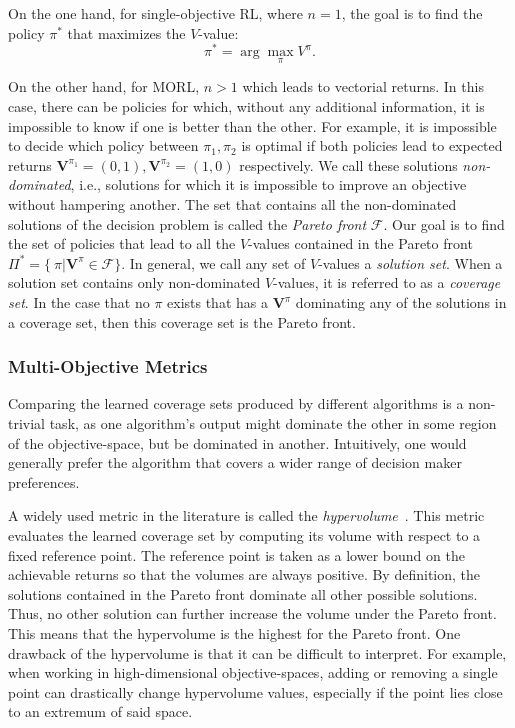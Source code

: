 \documentclass{article}
\renewcommand{\cite}[1]{\citep{#1}}
\newcommand{\mdppolicy}{\pi}
\newcommand{\mdpvaluefunction}{V}
\newcommand{\momdpvaluefunction}{\mathbf{V}}
\begin{document}
On the one hand, for single-objective RL, where $n = 1$, the goal is to find the policy $\mdppolicy^{*}$ that maximizes the $\mdpvaluefunction$-value:
\begin{equation}
\mdppolicy^*= \arg\max_\mdppolicy \mdpvaluefunction^\mdppolicy.
\end{equation}

On the other hand, for MORL, $n > 1$ which leads to vectorial returns. In this case, there can be policies for which, without any additional information, it is impossible to know if one is better than the other. For example, it is impossible to decide which policy between $\mdppolicy_1, \mdppolicy_2$ is optimal if both policies lead to expected returns $\momdpvaluefunction^{\mdppolicy_1}=(0,1), \momdpvaluefunction^{\mdppolicy_2}=(1,0)$ respectively. We call these solutions \emph{non-dominated}, i.e., solutions for which it is impossible to improve an objective without hampering another. The set that contains all the non-dominated solutions of the decision problem is called the \emph{Pareto front} $\mathcal{F}$. Our goal is to find the set of policies that lead to all the $\mdpvaluefunction$-values contained in the Pareto front $\Pi^* = \{\ \pi | \momdpvaluefunction^{\pi} \in \mathcal{F}\}$. In general, we call any set of $\mdpvaluefunction$-values a \emph{solution set}. When a solution set contains only  non-dominated $\mdpvaluefunction$-values, it is referred to as a \emph{coverage set}. In the case that no $\mdppolicy$ exists that has a $\momdpvaluefunction^{\pi}$ dominating any of the solutions in a coverage set, then this coverage set is the Pareto front.

\subsubsection{Multi-Objective Metrics}
Comparing the learned coverage sets produced by different algorithms is a non-trivial task, as one algorithm's output might dominate the other in some region of the objective-space, but be dominated in another. Intuitively, one would generally prefer the algorithm that covers a wider range of decision maker preferences. %

A widely used metric in the literature is called the \emph{hypervolume}~\cite{zitzler2003}. This metric evaluates the learned coverage set by computing its volume with respect to a fixed reference point. The reference point is taken as a lower bound on the achievable returns so that the volumes are always positive. By definition, the solutions contained in the Pareto front dominate all other possible solutions. Thus, no other solution can further increase the volume under the Pareto front. This means that the hypervolume is the highest for the Pareto front. One drawback of the hypervolume is that it can be difficult to interpret. For example, when working in high-dimensional objective-spaces, adding or removing a single point can drastically change hypervolume values, especially if the point lies close to an extremum of said space.
\end{document}
